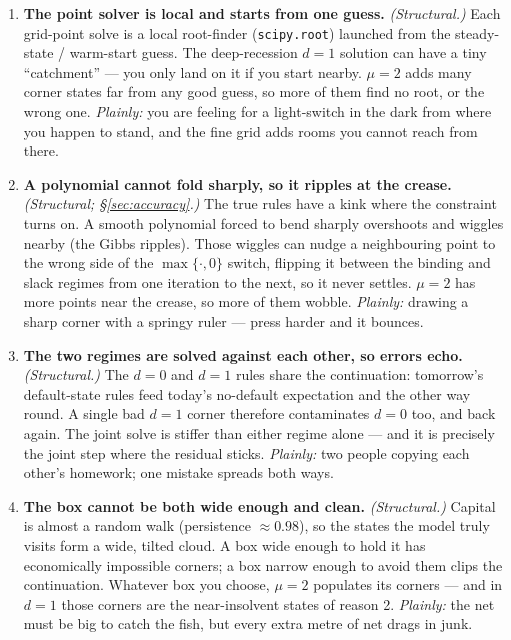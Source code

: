 \documentclass[11pt]{article}
\newcommand{\code}[1]{\texttt{#1}}
\begin{document}
\begin{enumerate}
\item \textbf{The point solver is local and starts from one guess.}
      \emph{(Structural.)} Each grid-point solve is a local root-finder
      (\code{scipy.root}) launched from the steady-state / warm-start guess.
      The deep-recession $d=1$ solution can have a tiny ``catchment'' --- you
      only land on it if you start nearby. $\mu=2$ adds many corner states far
      from any good guess, so more of them find no root, or the wrong one.
      \emph{Plainly:} you are feeling for a light-switch in the dark from
      where you happen to stand, and the fine grid adds rooms you cannot reach
      from there.

\item \textbf{A polynomial cannot fold sharply, so it ripples at the crease.}
      \emph{(Structural; \S\ref{sec:accuracy}.)} The true rules have a kink
      where the constraint turns on. A smooth polynomial forced to bend
      sharply overshoots and wiggles nearby (the Gibbs ripples). Those wiggles
      can nudge a neighbouring point to the wrong side of the
      $\max\{\cdot,0\}$ switch, flipping it between the binding and slack
      regimes from one iteration to the next, so it never settles. $\mu=2$ has
      more points near the crease, so more of them wobble. \emph{Plainly:}
      drawing a sharp corner with a springy ruler --- press harder and it
      bounces.

\item \textbf{The two regimes are solved against each other, so errors echo.}
      \emph{(Structural.)} The $d=0$ and $d=1$ rules share the continuation:
      tomorrow's default-state rules feed today's no-default expectation and
      the other way round. A single bad $d=1$ corner therefore contaminates
      $d=0$ too, and back again. The joint solve is stiffer than either regime
      alone --- and it is precisely the joint step where the residual sticks.
      \emph{Plainly:} two people copying each other's homework; one mistake
      spreads both ways.

\item \textbf{The box cannot be both wide enough and clean.}
      \emph{(Structural.)} Capital is almost a random walk (persistence
      $\approx0.98$), so the states the model truly visits form a wide,
      tilted cloud. A box wide enough to hold it has economically impossible
      corners; a box narrow enough to avoid them clips the continuation.
      Whatever box you choose, $\mu=2$ populates its corners --- and in $d=1$
      those corners are the near-insolvent states of reason 2.
      \emph{Plainly:} the net must be big to catch the fish, but every extra
      metre of net drags in junk.


\end{enumerate}
\end{document}
